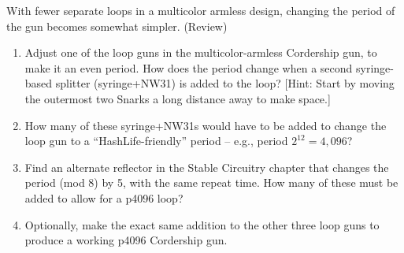 \begin{multicols}{2}
\mfilbreak


% 	
% 		
% 		

\begin{problem}\label{exer:multicolor_armless}
    With fewer separate loops in a multicolor armless design, changing the period of the gun becomes somewhat simpler. (Review)
	\begin{enumerate}[label=\bf\color{ocre}(\alph*)]
		\item Adjust one of the loop guns in the multicolor-armless Cordership gun, to make it an even period. How does the period change when a second syringe-based splitter (syringe+NW31) is added to the loop? [Hint: Start by moving the outermost two Snarks a long distance away to make space.]
		\item How many of these syringe+NW31s would have to be added to change the loop gun to a ``HashLife-friendly'' period -- e.g., period $2^{12} = 4,096$?
		\item Find an alternate reflector in the Stable Circuitry chapter %
        that changes the period (mod 8) by 5, with the same repeat time. How many of these must be added to allow for a p4096 loop?
        \item Optionally, make the exact same addition to the other three loop guns to produce a working p4096 Cordership gun.
	\end{enumerate}
\end{problem}



\end{multicols}
